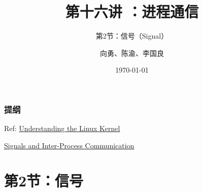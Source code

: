 


\title[第16讲]{第十六讲 ：进程通信} %
\subtitle{第2节：信号（Signal）}
\author{向勇、陈渝、李国良} %
\date{\today} %



\begin{frame}
\titlepage %
\end{frame}

\begin{frame}
\frametitle{提纲} %
\tableofcontents %

\pause

Ref: 
\href{http://ermak.cs.nstu.ru/understanding.linux.kernel.pdf }{Understanding the Linux Kernel}

\href{https://compas.cs.stonybrook.edu/~nhonarmand/courses/fa14/cse506.2/slides/ipc.pdf}{Signals and Inter-Process Communication}
\end{frame}
\section{第2节：信号} %
